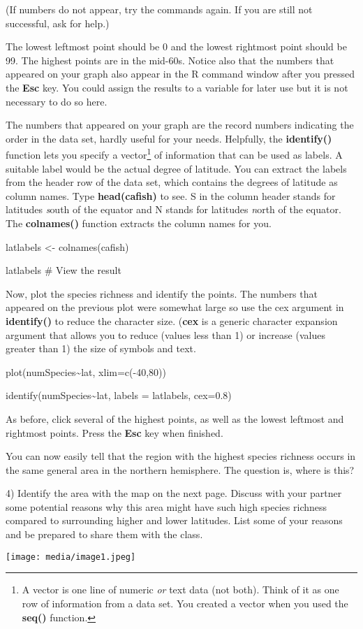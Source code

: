 (If numbers do not appear, try the commands again. If you are still not
successful, ask for help.)

The lowest leftmost point should be 0 and the lowest rightmost point
should be 99. The highest points are in the mid-60s. Notice also that
the numbers that appeared on your graph also appear in the R command
window after you pressed the \textbf{Esc} key. You could assign the
results to a variable for later use but it is not necessary to do so
here.

The numbers that appeared on your graph are the record numbers
indicating the order in the data set, hardly useful for your needs.
Helpfully, the \textbf{identify()} function lets you specify a
vector\footnote{A vector is one line of numeric \emph{or} text data (not
  both). Think of it as one row of information from a data set. You
  created a vector when you used the \textbf{seq()} function.} of
information that can be used as labels. A suitable label would be the
actual degree of latitude. You can extract the labels from the header
row of the data set, which contains the degrees of latitude as column
names. Type \textbf{head(cafish)} to see. S in the column header stands
for latitudes \emph{s}outh of the equator and N stands for latitudes
\emph{n}orth of the equator. The \textbf{colnames()} function extracts
the column names for you.

latlabels \textless{}- colnames(cafish)

latlabels \# View the result

Now, plot the species richness and identify the points. The numbers that
appeared on the previous plot were somewhat large so use the cex
argument in \textbf{identify()} to reduce the character size.
(\textbf{cex} is a generic character expansion argument that allows you
to reduce (values less than 1) or increase (values greater than 1) the
size of symbols and text.

plot(numSpecies\textasciitilde{}lat, xlim=c(-40,80))

identify(numSpecies\textasciitilde{}lat, labels = latlabels, cex=0.8)

As before, click several of the highest points, as well as the lowest
leftmost and rightmost points. Press the \textbf{Esc} key when finished.

You can now easily tell that the region with the highest species
richness occurs in the same general area in the northern hemisphere. The
question is, where is this?

4) Identify the area with the map on the next page. Discuss with your
partner some potential reasons why this area might have such high
species richness compared to surrounding higher and lower latitudes.
List some of your reasons and be prepared to share them with the class.

\texttt{[image: media/image1.jpeg]}

